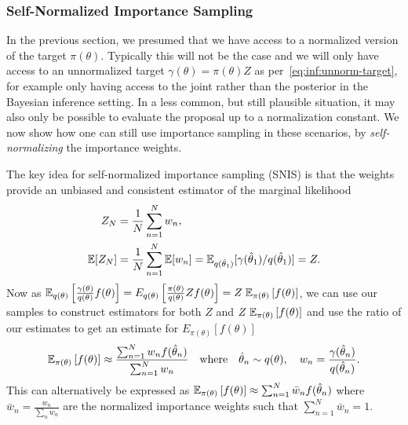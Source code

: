 \subsubsection{Self-Normalized Importance Sampling}
\label{sec:inf:foundation:importance:self-norm}

In the previous section, we presumed that we have access to a normalized version of the target
$\pi(\theta)$.  Typically this will not be the case and we will only have access to an
unnormalized target $\gamma(\theta)=\pi(\theta)Z$ as per~\eqref{eq:inf:unnorm-target},
for example only having access to the joint rather than the posterior in the Bayesian inference setting.
In a less common, but still plausible situation, it may also only be possible to evaluate the proposal
up to a normalization constant.
We now show how one can still use importance sampling in these scenarios, by
\emph{self-normalizing} the importance weights.

The key idea for self-normalized importance sampling (SNIS) is that the weights provide
an unbiased and consistent estimator of the marginal likelihood
\begin{align}
Z_N &= \frac{1}{N} \sum_{n=1}^{N} w_n, \\
\mathbb{E} [Z_N] &= \frac{1}{N} \sum_{n=1}^{N} \mathbb{E}[w_n] =\mathbb{E}_{q(\hat{\theta}_1)}[\gamma(\hat{\theta}_1)/q(\hat{\theta}_1)] = Z.
\end{align}
Now as $\mathbb{E}_{q(\theta)}\left[\frac{\gamma(\theta)}{q(\theta)}f(\theta)\right]=
E_{q(\theta)}\left[\frac{\pi(\theta)}{q(\theta)} Zf(\theta)\right]=Z\;\mathbb{E}_{\pi(\theta)} \left[f(\theta)\right]$, we can 
use our samples to construct \mc estimators for both $Z$ and $Z\;\mathbb{E}_{\pi(\theta)} \left[f(\theta)\right]$ and use the ratio
of our estimates to get an estimate for $E_{\pi(\theta)} \left[f(\theta)\right]$
\begin{align}
\label{eq:inf:snis}
\mathbb{E}_{\pi(\theta)} \left[f(\theta)\right] \approx \frac{\sum_{n=1}^{N} w_n f(\hat{\theta}_n)}{\sum_{n=1}^{N} w_n}
\quad \mathrm{where} \quad \hat{\theta}_n \sim q(\theta), \quad w_n = \frac{\gamma(\hat{\theta}_n)}{q(\hat{\theta}_n)}.
\end{align} 
This can alternatively be expressed as
$\mathbb{E}_{\pi(\theta)} \left[f(\theta)\right] \approx \sum_{n=1}^{N} \bar{w}_n f(\hat{\theta}_n)$
where $\bar{w}_n = \frac{w_n}{\sum_{n} w_n}$ are the normalized importance 
weights such that $\sum_{n=1}^N\bar{w}_n = 1$.  

